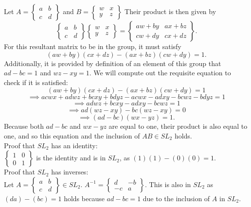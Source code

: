\documentclass[12pt,letterpaper]{article}
\begin{document}
Let \(A = \begin{Bmatrix} a & b \\ c & d \end{Bmatrix}\) and \(B = \begin{Bmatrix} w & x \\ y & z \end{Bmatrix}\) Their product is then given by \[\begin{Bmatrix} a & b \\ c & d \end{Bmatrix} \begin{Bmatrix} w & x \\ y & z \end{Bmatrix} = \begin{Bmatrix} aw + by & ax + bz \\ cw + dy & cx + dz \end{Bmatrix}.\] For this resultant matrix to be in the group, it must satisfy \[(aw+by)(cx+dz) - (ax + bz )(cw + dy) = 1.\] Additionally, it is provided by definition of an element of this group that \(ad - bc = 1\) and \(wz - xy = 1\). We will compute out the requisite equation to check if it is satisfied: \[(aw+by)(cx+dz) - (ax + bz)(cw+dy) = 1\] \[\implies acwx + adwz + bcxy + bdyz -  acwx - adxy - bcwz - bdyz = 1\] \[\implies adwz + bcxy - adxy - bcwz = 1\] \[\implies ad(wz - xy) - bc(wz - xy) = 0\] \[\implies (ad-bc)(wx-yz) = 1.\] Because both \(ad - bc\) and \(wx - yz\) are equal to one, their product is also equal to one, and so this equation and the inclusion of \(AB \in SL_{2}\) holds. \\

Proof that \(SL_{2}\) has an identity: \\

\(\begin{Bmatrix} 1 & 0 \\ 0 & 1 \end{Bmatrix}\) is the identity and is in \(SL_{2}\), as \((1)(1) - (0)(0) = 1\). \\

Proof that \(SL_{2}\) has inverses: \\

Let \(A = \begin{Bmatrix} a & b \\ c & d \end{Bmatrix} \in SL_{2}\). \(A^{-1} = \begin{Bmatrix} d & -b \\ -c & a \end{Bmatrix}\). This is also in \(SL_{2}\) as \((da) - (bc) = 1\) holds because \(ad- bc = 1\) due to the inclusion of \(A\) in \(SL_{2}\). \\
\end{document}
